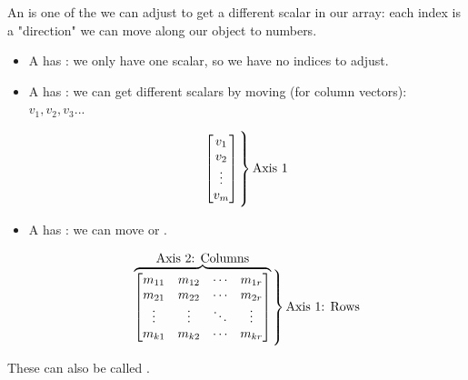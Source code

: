         \begin{definition}
            An  is one of the  we can adjust to get a different scalar in our array: each index is a "direction" we can move along our object to  numbers.
            
            \begin{itemize}
                \item A  has : we only have one scalar, so we have no indices to adjust.
                
                \boxdiv
                
                \item A  has : we can get different scalars by moving  (for column vectors): $v_1, v_2, v_3...$
                
                \begin{equation*}
                    \begin{bmatrix}
                        v_1\\v_2\\ \vdots \\ v_m
                    \end{bmatrix}
                    \bigggrB{60pt} \text{Axis 1}
                \end{equation*}
                
                \boxdiv
                
                \item A  has : we can move  or .
                
                \begin{equation*}
                    \overbrace{
                        \begin{bmatrix}
                            m_{11} & m_{12} & \cdots & m_{1r} \\ 
                            m_{21} & m_{22} & \cdots & m_{2r} \\ 
                            \vdots & \vdots & \ddots & \vdots \\
                            m_{k1} & m_{k2} & \cdots & m_{kr} \\ 
                        \end{bmatrix}
                    }^{ \text{\normalsize Axis 2: Columns} }
                    \bigggrB{60pt} \text{Axis 1: Rows}
                \end{equation*}
            \end{itemize}
            
            These can also be called .
        \end{definition}

